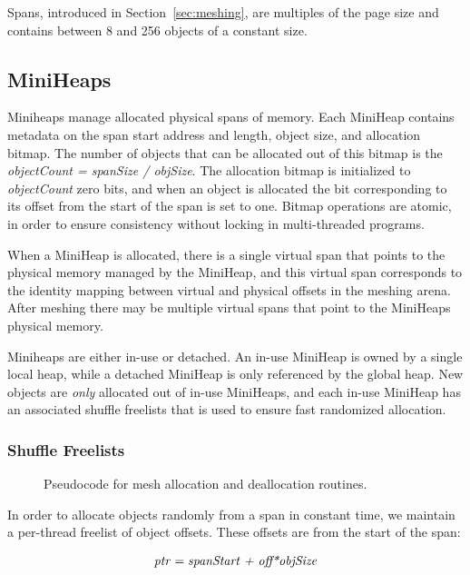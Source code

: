 Spans, introduced in Section~\ref{sec:meshing}, are multiples of the
page size and contains between 8 and 256 objects of a constant size.

\subsection{MiniHeaps}

Miniheaps manage allocated physical spans of memory.  Each MiniHeap
contains metadata on the span start address and length, object size,
and allocation bitmap.  The number of objects that can be allocated
out of this bitmap is the \textit{objectCount = spanSize / objSize}.
The allocation bitmap is initialized to \textit{objectCount} zero
bits, and when an object is allocated the bit corresponding to its
offset from the start of the span is set to one.  Bitmap operations
are atomic, in order to ensure consistency without locking in
multi-threaded programs.

When a MiniHeap is allocated, there is a single virtual span that
points to the physical memory managed by the MiniHeap, and this
virtual span corresponds to the identity mapping between virtual and
physical offsets in the meshing arena.  After meshing there may be
multiple virtual spans that point to the MiniHeaps physical memory.

Miniheaps are either in-use or detached.  An in-use MiniHeap is owned
by a single local heap, while a detached MiniHeap is only referenced
by the global heap.  New objects are \textit{only} allocated out of
in-use MiniHeaps, and each in-use MiniHeap has an associated shuffle
freelists that is used to ensure fast randomized allocation.

\subsubsection{Shuffle Freelists}

\begin{figure}[!ht]
  
  
  
  
  \caption{Pseudocode for mesh allocation and deallocation routines.}
  \label{fig:malloc}
\end{figure}

In order to allocate objects randomly from a span in constant time, we
maintain a per-thread freelist of object offsets.  These offsets are
from the start of the span:

\vspace{-1.2em}
\begin{align*}
  \text{\textit{ptr}} = \text{\textit{spanStart + off*objSize}}
\end{align*}

